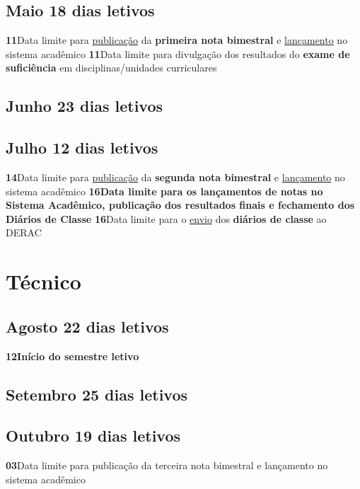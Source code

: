 \documentclass[thesis]{hmcposter}
\begin{document}
\begin{poster}
\subsection{Maio \hfill 18 dias letivos}\textbf{11}\qquad Data limite para \underline{publicação} da \textbf{primeira nota bimestral} e \underline{lançamento} no sistema acadêmico \newline \null\textbf{11}\qquad Data limite para divulgação dos resultados do \textbf{exame de suficiência} em disciplinas/unidades curriculares \newline \null\subsection{Junho \hfill 23 dias letivos}\subsection{Julho \hfill 12 dias letivos}\textbf{14}\qquad Data limite para \underline{publicação} da \textbf{segunda nota bimestral} e \underline{lançamento} no sistema acadêmico \newline \null\textbf{16}\qquad \textbf{Data limite para os lançamentos de notas no Sistema Acadêmico, publicação dos resultados finais e fechamento dos Diários de Classe} \newline \null\textbf{16}\qquad Data limite para o \underline{envio} dos \textbf{diários de classe} ao DERAC \newline \null\newpage
\section{\color{hmcorange}Técnico}\subsection{Agosto \hfill 22 dias letivos}\textbf{12}\qquad \textbf{Início do semestre letivo} \newline \null\subsection{Setembro \hfill 25 dias letivos}\subsection{Outubro \hfill 19 dias letivos}\textbf{03}\qquad Data limite para publicação da terceira nota bimestral e lançamento no sistema acadêmico \newline \null\vfill\null
\columnbreak

\end{poster}
\end{document}
